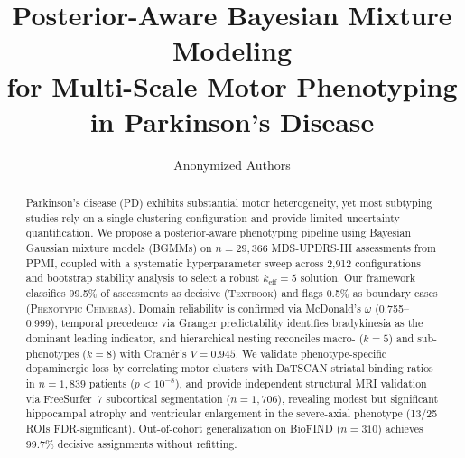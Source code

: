 \documentclass[runningheads]{llncs}
\begin{document}
\title{Posterior-Aware Bayesian Mixture Modeling\\for Multi-Scale Motor Phenotyping\\in Parkinson's Disease}

\author{Anonymized Authors}  %

\maketitle

\begin{abstract}
Parkinson's disease (PD) exhibits substantial motor heterogeneity, yet most subtyping studies rely on a single clustering configuration and provide limited uncertainty quantification. We propose a posterior-aware phenotyping pipeline using Bayesian Gaussian mixture models (BGMMs) on $n{=}29{,}366$ MDS-UPDRS-III assessments from PPMI, coupled with a systematic hyperparameter sweep across 2{,}912 configurations and bootstrap stability analysis to select a robust $k_{\mathrm{eff}}{=}5$ solution. Our framework classifies 99.5\% of assessments as decisive (\textsc{Textbook}) and flags 0.5\% as boundary cases (\textsc{Phenotypic Chimeras}). Domain reliability is confirmed via McDonald's $\omega$ (0.755--0.999), temporal precedence via Granger predictability identifies bradykinesia as the dominant leading indicator, and hierarchical nesting reconciles macro- ($k{=}5$) and sub-phenotypes ($k{=}8$) with Cram\'{e}r's $V{=}0.945$. We validate phenotype-specific dopaminergic loss by correlating motor clusters with DaTSCAN striatal binding ratios in $n{=}1{,}839$ patients ($p{<}10^{-8}$), and provide independent structural MRI validation via FreeSurfer~7 subcortical segmentation ($n{=}1{,}706$), revealing modest but significant hippocampal atrophy and ventricular enlargement in the severe-axial phenotype (13/25 ROIs FDR-significant). Out-of-cohort generalization on BioFIND ($n{=}310$) achieves 99.7\% decisive assignments without refitting.
\end{abstract}
\end{document}
